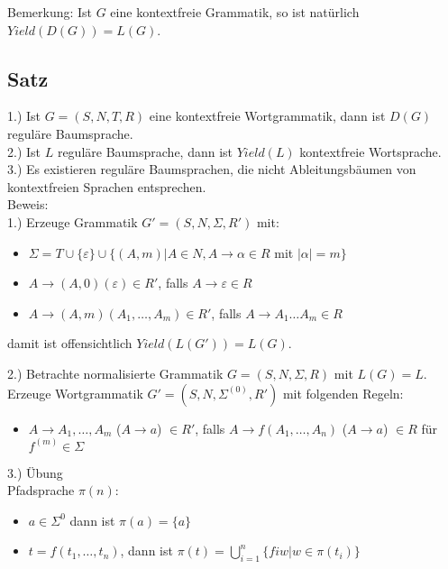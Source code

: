 \documentclass[titlepage]{article}
\begin{document}
Bemerkung: Ist $G$ eine kontextfreie Grammatik, so ist nat\"urlich $Yield(D(G)) = L(G)$.

\subsection{Satz}

1.) Ist $G = (S,N,T,R)$ eine kontextfreie Wortgrammatik, dann ist $D(G)$ regul\"are Baumsprache.\\
2.) Ist $L$ regul\"are Baumsprache, dann ist $Yield(L)$ kontextfreie Wortsprache.\\
3.) Es existieren regul\"are Baumsprachen, die nicht Ableitungsb\"aumen von kontextfreien Sprachen entsprechen.\\

Beweis:\\
1.) Erzeuge Grammatik $G' = (S,N,\Sigma,R')$ mit:\\
\begin{itemize}
    \item $\Sigma = T \cup \{\varepsilon\} \cup \{ (A,m) | A \in N, A \to \alpha \in R$ mit $|\alpha| = m \}$
    \item $A \to (A,0) (\varepsilon) \in R'$, falls $A \to \varepsilon \in R$
    \item $A \to (A,m) (A_1, \dots, A_m) \in R'$, falls $A \to A_1 \dots A_m \in R$
\end{itemize}
damit ist offensichtlich $Yield(L(G')) = L(G)$.

2.) Betrachte normalisierte Grammatik $G = (S,N,\Sigma,R)$ mit $L(G) = L$.\\
    Erzeuge Wortgrammatik $G' = (S,N,\Sigma^{(0)},R')$ mit folgenden Regeln:
\begin{itemize}
    \item $A \to A_1, \dots, A_m$ ($A \to a$) $\in R'$, falls $A \to f(A_1, \dots, A_n)$ ($A \to a$) $\in R$ f\"ur $f^{(m)} \in \Sigma$
\end{itemize}

3.) \"Ubung\\

Pfadsprache $\pi (n)$:

\begin{itemize}
    \item $a \in \Sigma ^ 0$ dann ist $\pi (a) = \{a\}$
    \item $t = f(t_1, \dots, t_n)$, dann ist $\pi (t) = \bigcup\limits_{i=1}^n \{ fiw | w \in \pi (t_i) \}$
\end{itemize}
\end{document}
